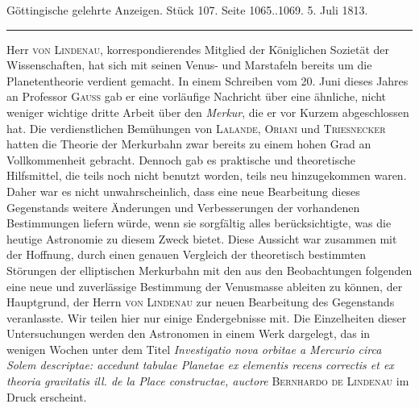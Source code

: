 \clearpage
{}
\begin{center}\small Göttingische gelehrte Anzeigen. Stück 107. Seite 1065..1069. 5. Juli 1813.\\[3pt]\rule{.72\linewidth}{.3pt}\end{center}

Herr \textsc{von Lindenau}, korrespondierendes Mitglied der Königlichen Sozietät der Wissenschaften, hat sich mit seinen Venus- und Marstafeln bereits um die Planetentheorie verdient gemacht. In einem Schreiben vom 20. Juni dieses Jahres an Professor \textsc{Gauß} gab er eine vorläufige Nachricht über eine ähnliche, nicht weniger wichtige dritte Arbeit über den \emph{Merkur}, die er vor Kurzem abgeschlossen hat. Die verdienstlichen Bemühungen von \textsc{Lalande}, \textsc{Oriani} und \textsc{Triesnecker} hatten die Theorie der Merkurbahn zwar bereits zu einem hohen Grad an Vollkommenheit gebracht. Dennoch gab es praktische und theoretische Hilfsmittel, die teils noch nicht benutzt worden, teils neu hinzugekommen waren. Daher war es nicht unwahrscheinlich, dass eine neue Bearbeitung dieses Gegenstands weitere Änderungen und Verbesserungen der vorhandenen Bestimmungen liefern würde, wenn sie sorgfältig alles berücksichtigte, was die heutige Astronomie zu diesem Zweck bietet. Diese Aussicht war zusammen mit der Hoffnung, durch einen genauen Vergleich der theoretisch bestimmten Störungen der elliptischen Merkurbahn mit den aus den Beobachtungen folgenden eine neue und zuverlässige Bestimmung der Venusmasse ableiten zu können, der Hauptgrund, der Herrn \textsc{von Lindenau} zur neuen Bearbeitung des Gegenstands veranlasste. Wir teilen hier nur einige Endergebnisse mit. Die Einzelheiten dieser Untersuchungen werden den Astronomen in einem Werk dargelegt, das in wenigen Wochen unter dem Titel \emph{Investigatio nova orbitae a Mercurio circa Solem descriptae: accedunt tabulae Planetae ex elementis recens correctis et ex theoria gravitatis ill. de la Place constructae, auctore} \textsc{Bernhardo de Lindenau} im Druck erscheint.

